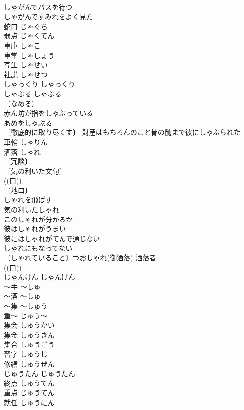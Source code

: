 \documentclass[8pt]{extreport}
\begin{document}
\begin{CJK}{UTF8}{min}
\\	しゃがんでバスを待つ 
\\	しゃがんですみれをよく見た 
\\	蛇口	じゃぐち	
\\	弱点	じゃくてん	
\\	車庫	しゃこ	
\\	車掌	しゃしょう	
\\	写生	しゃせい	
\\	社説	しゃせつ	
\\	しゃっくり	しゃっくり	
\\	しゃぶる	しゃぶる	
\\	〔なめる〕
\\	赤ん坊が指をしゃぶっている 
\\	あめをしゃぶる 
\\	〔徹底的に取り尽くす〕 財産はもちろんのこと骨の髄まで彼にしゃぶられた 
\\	車輪	しゃりん	
\\	洒落	しゃれ	
\\	〔冗談〕
\\	〔気の利いた文句〕
\\	((口)) 
\\	〔地口〕
\\	しゃれを飛ばす 
\\	気の利いたしゃれ 
\\	このしゃれが分かるか 
\\	彼はしゃれがうまい 
\\	彼にはしゃれがてんで通じない 
\\	しゃれにもなってない 
\\	〔しゃれていること〕⇒おしゃれ(御洒落) 洒落者 
\\	((口)) 
\\	じゃんけん	じゃんけん	
\\	～手	～しゅ	
\\	～酒	～しゅ	
\\	～集	～しゅう	
\\	重～	じゅう～	
\\	集会	しゅうかい	
\\	集金	しゅうきん	
\\	集合	しゅうごう	
\\	習字	しゅうじ	
\\	修繕	しゅうぜん	
\\	じゅうたん	じゅうたん	
\\	終点	しゅうてん	
\\	重点	じゅうてん	
\\	就任	しゅうにん	

\end{CJK}
\end{document}
